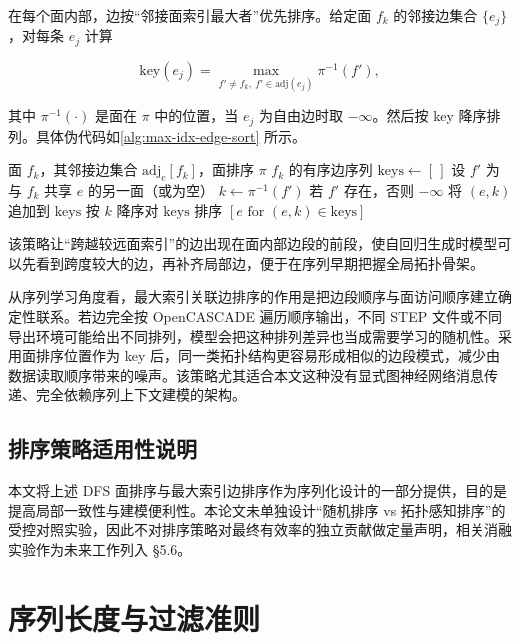 在每个面内部，边按“邻接面索引最大者”优先排序。给定面 $f_k$ 的邻接边集合 $\{e_j\}$，对每条 $e_j$ 计算

\begin{equation}
    \text{key}(e_j) = \max_{f' \ne f_k,\ f' \in \text{adj}(e_j)} \pi^{-1}(f'),
    \label{eq:edge-key}
\end{equation}

其中 $\pi^{-1}(\cdot)$ 是面在 $\pi$ 中的位置，当 $e_j$ 为自由边时取 $-\infty$。然后按 key 降序排列。具体伪代码如\autoref{alg:max-idx-edge-sort} 所示。

\begin{algorithm}[htbp]
    \caption{最大索引关联边排序算法}
    \label{alg:max-idx-edge-sort}
    \begin{algorithmic}[1]
        \Require 面 $f_k$，其邻接边集合 $\text{adj}_e[f_k]$，面排序 $\pi$
        \Ensure $f_k$ 的有序边序列
        \State $\text{keys} \gets [\,]$
            \State 设 $f'$ 为与 $f_k$ 共享 $e$ 的另一面（或为空）
            \State $k \gets \pi^{-1}(f')$ 若 $f'$ 存在，否则 $-\infty$
            \State 将 $(e, k)$ 追加到 $\text{keys}$
        \EndFor
        \State 按 $k$ 降序对 $\text{keys}$ 排序
        \State \Return $[e \text{ for } (e, k) \in \text{keys}]$
    \end{algorithmic}
\end{algorithm}

该策略让“跨越较远面索引”的边出现在面内部边段的前段，使自回归生成时模型可以先看到跨度较大的边，再补齐局部边，便于在序列早期把握全局拓扑骨架。

从序列学习角度看，最大索引关联边排序的作用是把边段顺序与面访问顺序建立确定性联系。若边完全按 OpenCASCADE 遍历顺序输出，不同 STEP 文件或不同导出环境可能给出不同排列，模型会把这种排列差异也当成需要学习的随机性。采用面排序位置作为 key 后，同一类拓扑结构更容易形成相似的边段模式，减少由数据读取顺序带来的噪声。该策略尤其适合本文这种没有显式图神经网络消息传递、完全依赖序列上下文建模的架构。


\subsection{排序策略适用性说明}

本文将上述 DFS 面排序与最大索引边排序作为序列化设计的一部分提供，目的是提高局部一致性与建模便利性。本论文未单独设计“随机排序 vs 拓扑感知排序”的受控对照实验，因此不对排序策略对最终有效率的独立贡献做定量声明，相关消融实验作为未来工作列入 §5.6。

\section{序列长度与过滤准则}

